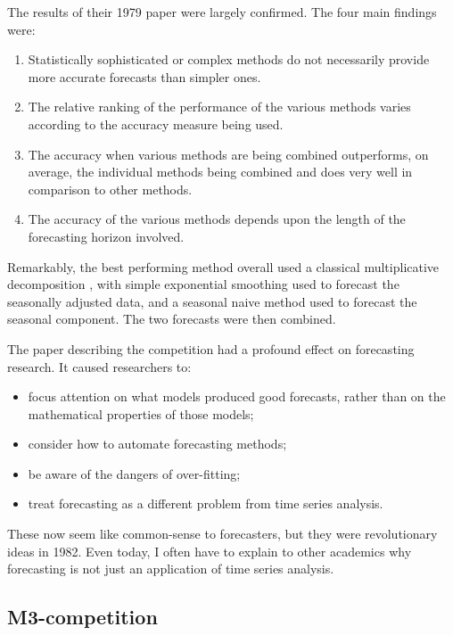 \documentclass[11pt,a4paper,]{article}
\providecommand{\tightlist}{%
  \setlength{\itemsep}{0pt}\setlength{\parskip}{0pt}}
\begin{document}
The results of their 1979 paper were largely confirmed. The four main findings \autocite[taken from][]{M3} were:

\begin{enumerate}
\def\labelenumi{\arabic{enumi}.}
\tightlist
\item
  Statistically sophisticated or complex methods do not necessarily provide more accurate forecasts than simpler ones.
\item
  The relative ranking of the performance of the various methods varies according to the accuracy measure being used.
\item
  The accuracy when various methods are being combined outperforms, on average, the individual methods being combined and does very well in comparison to other methods.
\item
  The accuracy of the various methods depends upon the length of the forecasting horizon involved.
\end{enumerate}

Remarkably, the best performing method overall used a classical multiplicative decomposition \autocite{fpp2}, with simple exponential smoothing used to forecast the seasonally adjusted data, and a seasonal naive method used to forecast the seasonal component. The two forecasts were then combined.

The paper describing the competition \autocite{M1} had a profound effect on forecasting research. It caused researchers to:

\begin{itemize}
\tightlist
\item
  focus attention on what models produced good forecasts, rather than on the mathematical properties of those models;
\item
  consider how to automate forecasting methods;
\item
  be aware of the dangers of over-fitting;
\item
  treat forecasting as a different problem from time series analysis.
\end{itemize}

These now seem like common-sense to forecasters, but they were revolutionary ideas in 1982. Even today, I often have to explain to other academics why forecasting is not just an application of time series analysis.

\hypertarget{m3-competition}{%
\subsection*{M3-competition}\label{m3-competition}}
\end{document}

